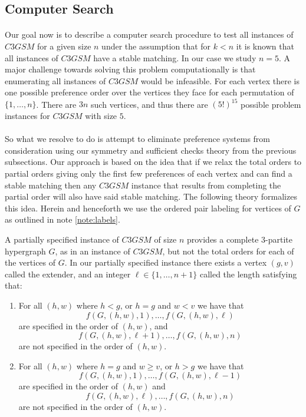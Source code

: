 \subsection{Computer Search}\label{sec:computersearch}
\paragraph{}
Our goal now is to describe a computer search procedure to test all instances of $C3GSM$ for a given size $n$ under the assumption that for $k<n$ it is known that all instances of $C3GSM$ have a stable matching. In our case we study $n=5$. A major challenge towards solving this problem computationally is that enumerating all instances of $C3GSM$ would be infeasible. For each vertex there is one possible preference order over the vertices they face for each permutation of $\{1,\dots,n\}$. There are $3n$ such vertices, and thus there are $(5!)^{15}$ possible problem instances for $C3GSM$ with size $5$. 
\paragraph{}
So what we resolve to do is attempt to eliminate preference systems from consideration using our symmetry and sufficient checks theory from the previous subsections. Our approach is based on the idea that if we relax the total orders to partial orders giving only the first few preferences of each vertex and can find a stable matching then any $C3GSM$ instance that results from completing the partial order will also have said stable matching. The following theory formalizes this idea. Herein and henceforth we use the ordered pair labeling for vertices of $G$ as outlined in note \ref{note:labels}.
\begin{definition}
A partially specified instance of $C3GSM$ of size $n$ provides a complete $3$-partite hypergraph $G$, as in an instance of $C3GSM$, but not the total orders for each of the vertices of $G$. In our partially specified instance there exists a vertex $(g,v)$ called the extender, and an integer $\ell \in \{1, \dots, n+1\}$ called the length satisfying that:
\begin{enumerate}
\item For all $(h,w)$ where $h < g$, or $h=g$ and $w < v$ we have that 
$$f(G, (h,w), 1), \dots, f(G,(h,w),\ell)$$
are specified in the order of $(h,w)$, and 
$$f(G, (h,w), \ell+1), \dots, f(G, (h,w), n)$$
are not specified in the order of $(h,w)$.
\item For all $(h,w)$ where $h = g$ and $w \geq v$, or $h > g$ we have that
$$f(G, (h,w), 1), \dots, f(G, (h,w), \ell -1)$$
are specified in the order of $(h,w)$ and
$$f(G, (h,w), \ell), \dots, f(G,(h,w), n)$$
are not specified in the order of $(h,w)$.
\end{enumerate}
\end{definition}

